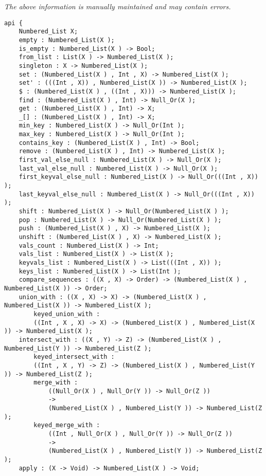 \label{api:Numbered\_List}

{\tiny \it The above information is manually maintained and may contain errors.}
\begin{verbatim}
api {
    Numbered_List X;
    empty : Numbered_List(X );
    is_empty : Numbered_List(X ) -> Bool;
    from_list : List(X ) -> Numbered_List(X );
    singleton : X -> Numbered_List(X );
    set : (Numbered_List(X ) , Int , X) -> Numbered_List(X );
    set' : (((Int , X)) , Numbered_List(X )) -> Numbered_List(X );
    $ : (Numbered_List(X ) , ((Int , X))) -> Numbered_List(X );
    find : (Numbered_List(X ) , Int) -> Null_Or(X );
    get : (Numbered_List(X ) , Int) -> X;
    _[] : (Numbered_List(X ) , Int) -> X;
    min_key : Numbered_List(X ) -> Null_Or(Int );
    max_key : Numbered_List(X ) -> Null_Or(Int );
    contains_key : (Numbered_List(X ) , Int) -> Bool;
    remove : (Numbered_List(X ) , Int) -> Numbered_List(X );
    first_val_else_null : Numbered_List(X ) -> Null_Or(X );
    last_val_else_null : Numbered_List(X ) -> Null_Or(X );
    first_keyval_else_null : Numbered_List(X ) -> Null_Or(((Int , X)) );
    last_keyval_else_null : Numbered_List(X ) -> Null_Or(((Int , X)) );
    shift : Numbered_List(X ) -> Null_Or(Numbered_List(X ) );
    pop : Numbered_List(X ) -> Null_Or(Numbered_List(X ) );
    push : (Numbered_List(X ) , X) -> Numbered_List(X );
    unshift : (Numbered_List(X ) , X) -> Numbered_List(X );
    vals_count : Numbered_List(X ) -> Int;
    vals_list : Numbered_List(X ) -> List(X );
    keyvals_list : Numbered_List(X ) -> List(((Int , X)) );
    keys_list : Numbered_List(X ) -> List(Int );
    compare_sequences : ((X , X) -> Order) -> (Numbered_List(X ) , Numbered_List(X )) -> Order;
    union_with : ((X , X) -> X) -> (Numbered_List(X ) , Numbered_List(X )) -> Numbered_List(X );
        keyed_union_with :
        ((Int , X , X) -> X) -> (Numbered_List(X ) , Numbered_List(X )) -> Numbered_List(X );
    intersect_with : ((X , Y) -> Z) -> (Numbered_List(X ) , Numbered_List(Y )) -> Numbered_List(Z );
        keyed_intersect_with :
        ((Int , X , Y) -> Z) -> (Numbered_List(X ) , Numbered_List(Y )) -> Numbered_List(Z );
        merge_with :
            ((Null_Or(X ) , Null_Or(Y )) -> Null_Or(Z ))
            ->
            (Numbered_List(X ) , Numbered_List(Y )) -> Numbered_List(Z );
        keyed_merge_with :
            ((Int , Null_Or(X ) , Null_Or(Y )) -> Null_Or(Z ))
            ->
            (Numbered_List(X ) , Numbered_List(Y )) -> Numbered_List(Z );
    apply : (X -> Void) -> Numbered_List(X ) -> Void;

\end{verbatim}
